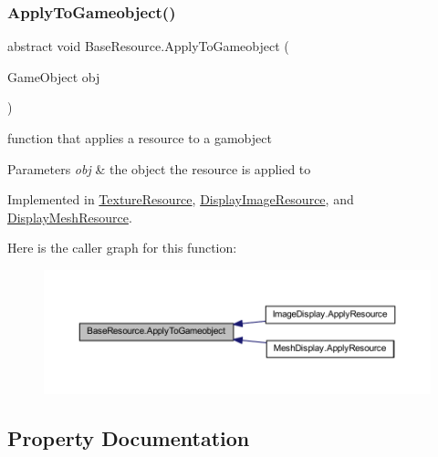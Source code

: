 \subsubsection{\texorpdfstring{Apply\+To\+Gameobject()}{ApplyToGameobject()}}
{\footnotesize\ttfamily abstract void Base\+Resource.\+Apply\+To\+Gameobject (\begin{DoxyParamCaption}\item[{Game\+Object}]{obj }\end{DoxyParamCaption})\hspace{0.3cm}{\ttfamily [pure virtual]}}



function that applies a resource to a gamobject 


\begin{DoxyParams}{Parameters}
{\em obj} & the object the resource is applied to\\
\hline
\end{DoxyParams}


Implemented in \mbox{\hyperlink{class_texture_resource_a29bbc4442f2a390b5f40cab63c01b282}{Texture\+Resource}}, \mbox{\hyperlink{class_display_image_resource_a26992a5ecb6c449d85539cc5d07112e2}{Display\+Image\+Resource}}, and \mbox{\hyperlink{class_display_mesh_resource_a62672f28a402bebeed1cb79fcca81828}{Display\+Mesh\+Resource}}.

Here is the caller graph for this function\+:
\nopagebreak
\begin{figure}[H]
\begin{center}
\leavevmode
\includegraphics[width=350pt]{class_base_resource_a2d832c8042114da9e3f6240651d59703_icgraph}
\end{center}
\end{figure}


\subsection{Property Documentation}
\mbox{\label{class_base_resource_a947dc7c31c7b98089aa6f560f90c4cb3}} 

